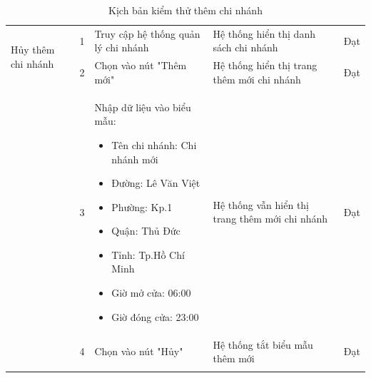 {\begin{longtable}{| p{2.5cm}| p{1cm}| p{5.5cm}| p{4.5cm} | p{1.5cm} |}
        \multirow[t]{2}{2.5cm}{Hủy thêm chi nhánh} & 1                                              & Truy cập hệ thống quản lý chi nhánh & Hệ thống hiển thị danh sách chi nhánh         & Đạt             \\
        \cline{2-5}
                                                   & 2                                              & Chọn vào nút "Thêm mới"             & Hệ thống hiển thị trang thêm mới chi nhánh    & Đạt             \\
        \cline{2-5}
                                                   & 3                                              & Nhập dữ liệu vào biểu mẫu:
        \begin{itemize}
            \item Tên chi nhánh: Chi nhánh mới
            \item Đường: Lê Văn Việt
            \item Phường: Kp.1
            \item Quận: Thủ Đức
            \item Tỉnh: Tp.Hồ Chí Minh
            \item Giờ mở cửa: 06:00
            \item Giờ đóng cửa: 23:00
        \end{itemize}         & Hệ thống vẫn hiển thị trang thêm mới chi nhánh & Đạt                                                                                                                        \\
        \cline{2-5}
                                                   & 4                                              & Chọn vào nút "Hủy"                  & Hệ thống tắt biểu mẫu thêm mới                & Đạt             \\
        \hline
        \caption{Kịch bản kiểm thử thêm chi nhánh}
    \end{longtable}
}


